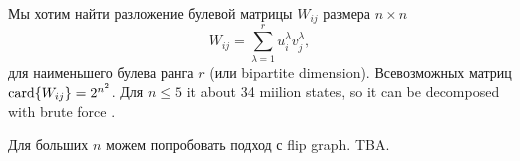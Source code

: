 Мы хотим найти разложение булевой матрицы $W_{ij}$ размера $n\times n$
\begin{equation*}
	W_{ij} = \sum_{\lambda=1}^r u^\lambda_i v^\lambda_j,
\end{equation*}
для наименьшего булева ранга $r$ (или bipartite dimension). Всевозможных матриц $\mathop{\mathrm{card}}\nolimits\{W_{ij}\} = 2^{n^2}$. Для $n \leq 5$ it about 34 miilion states, so it can be decomposed with brute force . 

Для больших $n$ можем попробовать подход с flip graph. TBA. 